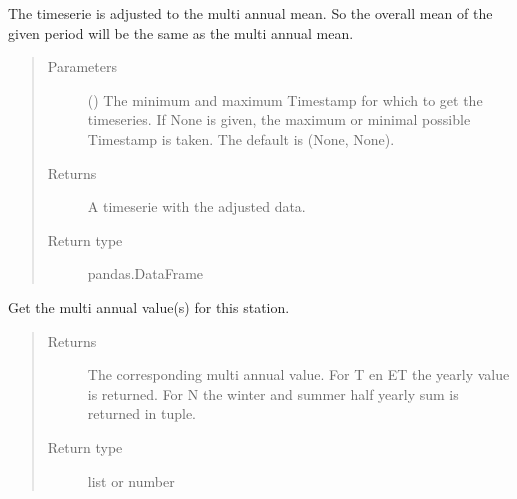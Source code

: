 \documentclass[letterpaper,10pt,english]{sphinxmanual}
\begin{document}
\begin{fulllineitems}
\begin{fulllineitems}
\sphinxAtStartPar
The timeserie is adjusted to the multi annual mean.
So the overall mean of the given period will be the same as the multi annual mean.
\begin{quote}\begin{description}
\item[{Parameters}] \leavevmode
\sphinxAtStartPar
{} ({\hyperref[\detokenize{weatherDB.lib:weatherDB.lib.utils.TimestampPeriod}]{}}\sphinxstyleliteralemphasis{\sphinxupquote{(}}\sphinxstyleliteralemphasis{\sphinxupquote{)}}\sphinxstyleliteralemphasis{\sphinxupquote{, }}) \textendash{} The minimum and maximum Timestamp for which to get the timeseries.
If None is given, the maximum or minimal possible Timestamp is taken.
The default is (None, None).

\item[{Returns}] \leavevmode
\sphinxAtStartPar
A timeserie with the adjusted data.

\item[{Return type}] \leavevmode
\sphinxAtStartPar
pandas.DataFrame

\end{description}\end{quote}

\end{fulllineitems}


\begin{fulllineitems}
\label{\detokenize{weatherDB:weatherDB.station.TemperatureStation.get_multi_annual}}
\sphinxAtStartPar
Get the multi annual value(s) for this station.
\begin{quote}\begin{description}
\item[{Returns}] \leavevmode
\sphinxAtStartPar
The corresponding multi annual value.
For T en ET the yearly value is returned.
For N the winter and summer half yearly sum is returned in tuple.

\item[{Return type}] \leavevmode
\sphinxAtStartPar
list or number

\end{description}\end{quote}

\end{fulllineitems}


\end{fulllineitems}
\end{document}
